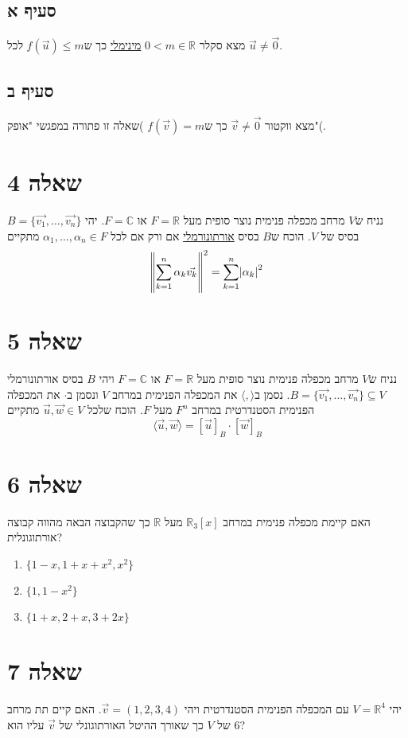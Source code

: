 \documentclass[11pt, oneside]{article}
\newcommand{\mR}{\mathbb{R}}
\newcommand{\mC}{\mathbb{C}}
\newcommand{\ip}[2]{\langle #1, #2 \rangle}
\begin{document}
\subsection{סעיף א}
מצא סקלר $0 < m \in \mR$ \underline{מינימלי} כך ש$f(\vec{u}) \le m$ לכל $\vec{u} \neq \vec0$.
\subsection{סעיף ב}
מצא ווקטור $\vec{v} \neq \vec0$ כך ש$f(\vec{v}) = m$ )שאלה זו פתורה במפגשי "אופק"(.

\section{שאלה 4}
נניח ש$V$ מרחב מכפלה פנימית נוצר סופית מעל $F = \mR$ או $F = \mC$. יהי $B = \{\vec{v_1}, \dots, \vec{v_n}\}$ בסיס של $V$. הוכח ש$B$ בסיס \underline{אורתונורמלי} אם ורק אם לכל $\alpha_1, \dots, \alpha_n \in F$ מתקיים
\[
\norm{\sum^{n}_{k = 1} \alpha_k \vec{v_k}}^2 = \sum^{n}_{k = 1} \abs{\alpha_k}^2
\]

\section{שאלה 5}
נניח ש$V$ מרחב מכפלה פנימית נוצר סופית מעל $F = \mR$ או $F = \mC$ ויהי $B$ בסיס אורתונורמלי $B = \{\vec{v_1}, \dots, \vec{v_n}\} \subseteq V$. נסמן ב$\ip{}{}$ את המכפלה הפנימית במרחב $V$ ונסמן ב$\cdot$ את המכפלה הפנימית הסטנדרטית במרחב $F^n$ מעל $F$. הוכח שלכל $\vec{u}, \vec{w} \in V$ מתקיים
\[
\ip{\vec{u}}{\vec{w}} = [\vec{u}]_B \cdot [\vec{w}]_B
\]

\section{שאלה 6}
האם קיימת מכפלה פנימית במרחב $\mR_3[x]$ מעל $\mR$ כך שהקבוצה הבאה מהווה קבוצה אורתוגונלית?
\begin{enumerate}
\item $\{1 - x, 1 + x + x^2, x^2\}$
\item $\{1, 1 - x^2\}$
\item $\{1 + x, 2 + x, 3 + 2x\}$
\end{enumerate}
\clearpage
\section{שאלה 7}
יהי $V = \mR^4$ עם המכפלה הפנימית הסטנדרטית ויהי $\vec{v} = (1, 2, 3, 4)$. האם קיים תת מרחב של $V$ כך שאורך ההיטל האורתוגונלי של $\vec{v}$ עליו הוא $6$?
\end{document}
